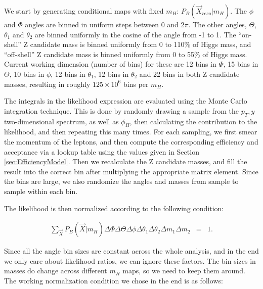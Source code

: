 \documentclass{cmspaper}
\begin{document}
%
%
%

We start by generating conditional maps with fixed $m_H$: $P_B(\vec{X}_{reco} | m_H)$.
The $\phi$ and $\Phi$ angles are binned in uniform steps between 0 and $2\pi$.
The other angles, $\Theta$, $\theta_1$ and $\theta_2$ are binned uniformly
in the cosine of the angle from -1 to 1.
The ``on-shell'' Z candidate mass is binned uniformly from 0 to 110\% of Higgs mass,
and ``off-shell'' Z candidate mass is binned uniformly from 0 to 55\% of Higgs mass.
Current working dimension (number of bins) for these are
12 bins in $\Phi$, 15 bins in $\Theta$, 10 bins in $\phi$, 12 bins in $\theta_1$,
12 bins in $\theta_2$ and 22 bins in both Z candidate masses, resulting
in roughly $125 \times 10^6$ bins per $m_H$.

The integrals in the likelihood expression are evaluated using the Monte Carlo integration technique.
This is done by randomly drawing a sample from the $p_T, y$ two-dimensional spectrum, as well
as $\phi_H$, then calculating the contribution to the likelihood, and then repeating this many times.
For each sampling, we first smear the momentum of the leptons, and then compute the corresponding efficiency and acceptance
via a lookup table using the values given in Section \ref{sec:EfficiencyModel}.
Then we recalculate the Z candidate masses, and fill the result into the correct bin
after multiplying the appropriate matrix element. Since the bins are large, we also randomize the angles and masses from sample
to sample within each bin.

The likelihood is then normalized according to the following condition:

\begin{eqnarray}
\sum_{\vec{X}} P_B(\vec{X} | m_H) \Delta\Phi \Delta\Theta \Delta\phi \Delta\theta_1 \Delta\theta_2
   \Delta m_1 \Delta m_2 &=& 1. 
\end{eqnarray}

Since all the angle bin sizes are constant across the whole analysis,
and in the end we only care about likelihood ratios, we can ignore these factors.
The bin sizes in masses do change across different $m_H$ maps, so we need to
keep them around.  The working normalization condition we chose
in the end is as follows:
\end{document}
